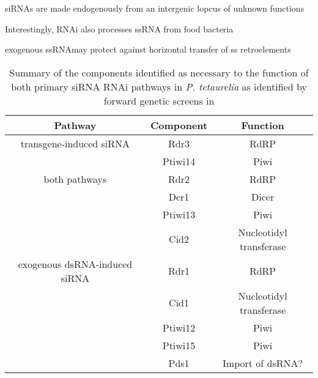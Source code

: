 siRNAs are made endogenously from an intergenic lopcus of unknown functions \citep{Marker2010,Marker2014}



Interestingly, RNAi also processes ssRNA from food bacteria 


exogenous ssRNAmay protect against horizontal transfer of ss retroelements \citep{Carradec2015}






\begin{table}
    \centering
    \begin{tabular}{|c|c|c|}
        \hline
        \textbf{Pathway} & \textbf{Component} & \textbf{Function} \\
        \hline
        transgene-induced siRNA & Rdr3 & RdRP \\
                                & Ptiwi14 & Piwi \\
        both pathways           & Rdr2 & RdRP \\
                                & Dcr1 & Dicer \\
                                & Ptiwi13 & Piwi \\
                                & Cid2 & Nucleotidyl transferase \\
        exogenous dsRNA-induced siRNA & Rdr1 & RdRP \\
                                      & Cid1 & Nucleotidyl transferase \\
                                      & Ptiwi12 & Piwi \\
                                      & Ptiwi15 & Piwi \\
                                      & Pds1 & Import of dsRNA? \\
        \hline
    \end{tabular}
    \caption[Summary of RNAi pathway components in \textit{P. tetaurelia}]{Summary
        of the components identified as necessary to the function of both
        primary siRNA RNAi pathways in \textit{P. tetaurelia} as identified
        by forward genetic screens in \citep{Marker2014}}
    \label{tab:marker_components}
\end{table}

